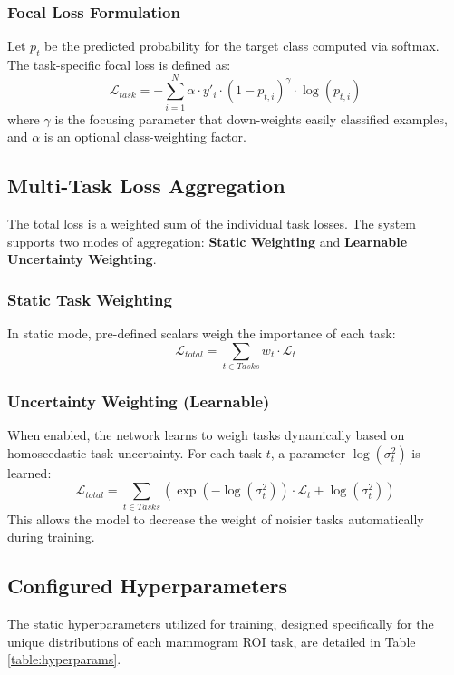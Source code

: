 \documentclass[11pt,a4paper]{article}
\begin{document}
\subsubsection{Focal Loss Formulation}
Let $p_t$ be the predicted probability for the target class computed via softmax. The task-specific focal loss is defined as:
\begin{equation}
\mathcal{L}_{task} = - \sum_{i=1}^{N} \alpha \cdot y'_i \cdot (1 - p_{t,i})^\gamma \cdot \log(p_{t,i})
\end{equation}
where $\gamma$ is the focusing parameter that down-weights easily classified examples, and $\alpha$ is an optional class-weighting factor.

\subsection{Multi-Task Loss Aggregation}
The total loss is a weighted sum of the individual task losses. The system supports two modes of aggregation: \textbf{Static Weighting} and \textbf{Learnable Uncertainty Weighting}.

\subsubsection{Static Task Weighting}
In static mode, pre-defined scalars weigh the importance of each task:
\begin{equation}
\mathcal{L}_{total} = \sum_{t \in Tasks} w_t \cdot \mathcal{L}_{t}
\end{equation}

\subsubsection{Uncertainty Weighting (Learnable)}
When enabled, the network learns to weigh tasks dynamically based on homoscedastic task uncertainty. For each task $t$, a parameter $\log(\sigma_t^2)$ is learned:
\begin{equation}
\mathcal{L}_{total} = \sum_{t \in Tasks} \left( \exp(-\log(\sigma_t^2)) \cdot \mathcal{L}_t + \log(\sigma_t^2) \right)
\end{equation}
This allows the model to decrease the weight of noisier tasks automatically during training.

\subsection{Configured Hyperparameters}
The static hyperparameters utilized for training, designed specifically for the unique distributions of each mammogram ROI task, are detailed in Table \ref{table:hyperparams}.
\end{document}
